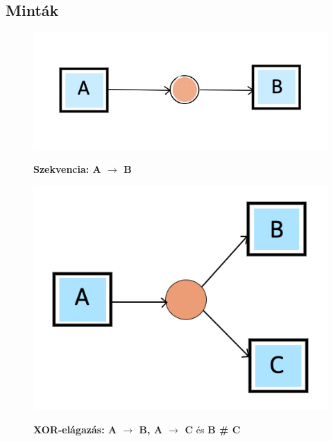 \subsection{Minták}

\begin{figure}[h!]
\begin{center}
\caption{\textbf{Szekvencia: A $\rightarrow$ B}}
\includegraphics[width=8truecm, height=4truecm]{images/img_alpha_seq}\\
\label{fig:example}
\end{center}
\end{figure}

\begin{figure}[h!]
\begin{center}
\caption{\textbf{XOR-elágazás: A $\rightarrow$ B, A $\rightarrow$ C} és \textbf{B \# C}}
\includegraphics[width=8truecm, height=6truecm]{images/img_alpha_xor}\\
\label{fig:example}
\end{center}
\end{figure}

